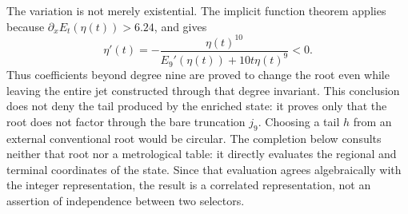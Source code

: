 The variation is not merely existential. The implicit function theorem
applies because \(\partial_xE_t(\eta(t))>6.24\), and gives
\begin{equation}
 \eta'(t)=-
 \frac{\eta(t)^{10}}
 {E_9'(\eta(t))+10t\eta(t)^9}<0.
 \label{eq:alpha-variacion-raiz-prolongacion}
\end{equation}
Thus coefficients beyond degree nine are proved to change the root
even while leaving the entire jet constructed through that degree invariant.
This conclusion does not deny the tail produced by the enriched state:
it proves only that the root does not factor through the bare truncation
\(j_9\). Choosing a tail \(h\) from an external conventional root
would be circular. The completion below consults neither that root nor a
metrological table: it directly evaluates the regional and terminal coordinates
of the state. Since that evaluation agrees algebraically with the integer
representation, the result is a correlated representation, not an assertion
of independence between two selectors.


